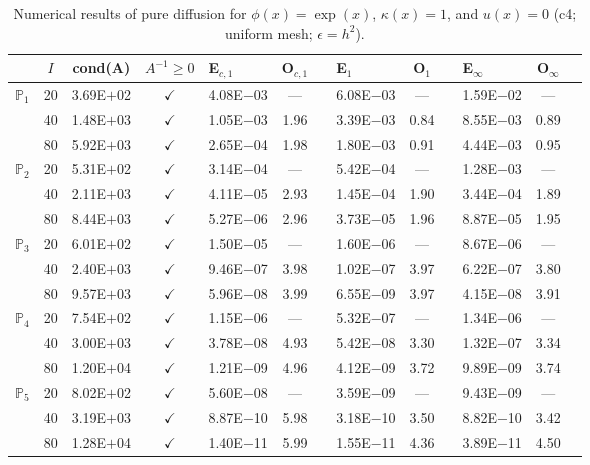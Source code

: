 \begin{table}[H]
\centering
\caption{Numerical results of pure diffusion for $\phi(x)=\exp(x)$, $\kappa(x)=1$, and $u(x)=0$ (c4; uniform mesh; $\epsilon=h^2$).}
\begin{tabular}{@{}l c c c l c c l c c l c c@{}}
\toprule
 & $I$ & cond(A) & $A^{-1}\geq 0$ &  E$_{c,1}$ & O$_{c,1}$ && E$_1$ & O$_1$ && E$_{\infty}$ & O$_{\infty}$\\
\midrule
\multirow{3}{*}{$\mathbb{P}_{1}$}
 & 20 & 3.69E$+$02 & $\checkmark$ & 4.08E$-$03 & --- && 6.08E$-$03 & --- && 1.59E$-$02 & ---\\
 & 40 & 1.48E$+$03 & $\checkmark$ & 1.05E$-$03 & 1.96 && 3.39E$-$03 & 0.84 && 8.55E$-$03 & 0.89\\
 & 80 & 5.92E$+$03 & $\checkmark$ & 2.65E$-$04 & 1.98 && 1.80E$-$03 & 0.91 && 4.44E$-$03 & 0.95\\
\midrule
\multirow{3}{*}{$\mathbb{P}_{2}$}
 & 20 & 5.31E$+$02 & $\checkmark$ & 3.14E$-$04 & --- && 5.42E$-$04 & --- && 1.28E$-$03 & ---\\
 & 40 & 2.11E$+$03 & $\checkmark$ & 4.11E$-$05 & 2.93 && 1.45E$-$04 & 1.90 && 3.44E$-$04 & 1.89\\
 & 80 & 8.44E$+$03 & $\checkmark$ & 5.27E$-$06 & 2.96 && 3.73E$-$05 & 1.96 && 8.87E$-$05 & 1.95\\
\midrule
\multirow{3}{*}{$\mathbb{P}_{3}$}
 & 20 & 6.01E$+$02 & $\checkmark$ & 1.50E$-$05 & --- && 1.60E$-$06 & --- && 8.67E$-$06 & ---\\
 & 40 & 2.40E$+$03 & $\checkmark$ & 9.46E$-$07 & 3.98 && 1.02E$-$07 & 3.97 && 6.22E$-$07 & 3.80\\
 & 80 & 9.57E$+$03 & $\checkmark$ & 5.96E$-$08 & 3.99 && 6.55E$-$09 & 3.97 && 4.15E$-$08 & 3.91\\
\midrule
\multirow{3}{*}{$\mathbb{P}_{4}$}
 & 20 & 7.54E$+$02 & $\checkmark$ & 1.15E$-$06 & --- && 5.32E$-$07 & --- && 1.34E$-$06 & ---\\
 & 40 & 3.00E$+$03 & $\checkmark$ & 3.78E$-$08 & 4.93 && 5.42E$-$08 & 3.30 && 1.32E$-$07 & 3.34\\
 & 80 & 1.20E$+$04 & $\checkmark$ & 1.21E$-$09 & 4.96 && 4.12E$-$09 & 3.72 && 9.89E$-$09 & 3.74\\
\midrule
\multirow{3}{*}{$\mathbb{P}_{5}$}
 & 20 & 8.02E$+$02 & $\checkmark$ & 5.60E$-$08 & --- && 3.59E$-$09 & --- && 9.43E$-$09 & ---\\
 & 40 & 3.19E$+$03 & $\checkmark$ & 8.87E$-$10 & 5.98 && 3.18E$-$10 & 3.50 && 8.82E$-$10 & 3.42\\
 & 80 & 1.28E$+$04 & $\checkmark$ & 1.40E$-$11 & 5.99 && 1.55E$-$11 & 4.36 && 3.89E$-$11 & 4.50\\
\bottomrule
\end{tabular}
\end{table}